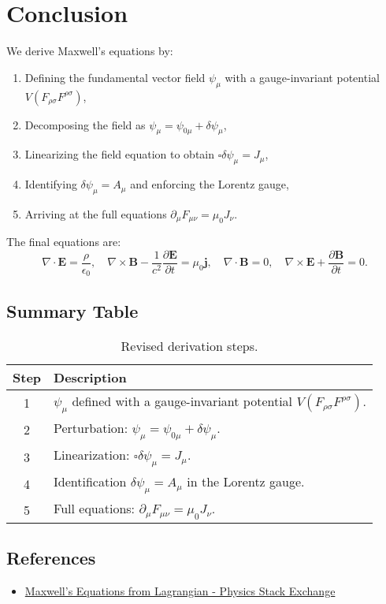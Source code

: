 \documentclass{article}
\begin{document}
	\section{Conclusion}
	We derive Maxwell’s equations by:
	\begin{enumerate}
		\item Defining the fundamental vector field \(\psi_\mu\) with a gauge-invariant potential \(V(F_{\rho\sigma} F^{\rho\sigma})\),
		\item Decomposing the field as \(\psi_\mu = \psi_{0\mu} + \delta \psi_\mu\),
		\item Linearizing the field equation to obtain \(\square \delta \psi_\mu = J_\mu\),
		\item Identifying \(\delta \psi_\mu = A_\mu\) and enforcing the Lorentz gauge,
		\item Arriving at the full equations \(\partial_\mu F_{\mu\nu} = \mu_0 J_\nu\).
	\end{enumerate}
	The final equations are:
	\[
	\nabla \cdot \mathbf{E} = \frac{\rho}{\epsilon_0}, \quad \nabla \times \mathbf{B} - \frac{1}{c^2} \frac{\partial \mathbf{E}}{\partial t} = \mu_0 \mathbf{j}, \quad \nabla \cdot \mathbf{B} = 0, \quad \nabla \times \mathbf{E} + \frac{\partial \mathbf{B}}{\partial t} = 0.
	\]
	
	\subsection{Summary Table}
	\begin{table}[h]
		\centering
		\begin{tabular}{|c|p{8cm}|}
			\hline
			\textbf{Step} & \textbf{Description} \\
			\hline
			1 & \(\psi_\mu\) defined with a gauge-invariant potential \(V(F_{\rho\sigma} F^{\rho\sigma})\). \\
			2 & Perturbation: \(\psi_\mu = \psi_{0\mu} + \delta \psi_\mu\). \\
			3 & Linearization: \(\square \delta \psi_\mu = J_\mu\). \\
			4 & Identification \(\delta \psi_\mu = A_\mu\) in the Lorentz gauge. \\
			5 & Full equations: \(\partial_\mu F_{\mu\nu} = \mu_0 J_\nu\). \\
			\hline
		\end{tabular}
		\caption{Revised derivation steps.}
	\end{table}
	
	\subsection{References}
	\begin{itemize}
		\item \href{https://physics.stackexchange.com/questions/3005}{Maxwell’s Equations from Lagrangian - Physics Stack Exchange}
	\end{itemize}
	
\end{document}
